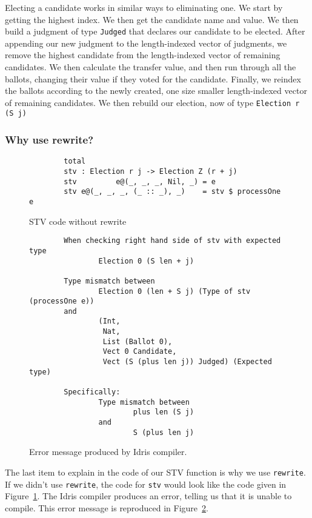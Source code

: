 Electing a candidate works in similar ways to eliminating one. We start by
getting the highest index. We then get the candidate name and value. We then
build a judgment of type \texttt{Judged} that declares our candidate to be
elected. After appending our new judgment to the length-indexed vector of
judgments, we remove the highest candidate from the length-indexed vector of
remaining candidates. We then calculate the transfer value, and then run through
all the ballots, changing their value if they voted for the candidate. Finally,
we reindex the ballots according to the newly created, one size smaller
length-indexed vector of remaining candidates. We then rebuild our election, now
of type \texttt{Election r (S j)}

\subsubsection{Why use rewrite?}


\begin{figure}[ht!!!!!!!!]
	\caption{STV code without rewrite}
	\label{no_rewrite_code}
    \begin{lstlisting}
        total
        stv : Election r j -> Election Z (r + j)
        stv         e@(_, _, _, Nil, _) = e
        stv e@(_, _, _, (_ :: _), _)    = stv $ processOne e
    \end{lstlisting}
\end{figure}

\begin{figure}[ht!!!!!!!!]
	\caption{Error message produced by Idris compiler.}
	\label{idris_error_code}
    \begin{lstlisting}
        When checking right hand side of stv with expected type
                Election 0 (S len + j)

        Type mismatch between
                Election 0 (len + S j) (Type of stv (processOne e))
        and
                (Int,
                 Nat,
                 List (Ballot 0),
                 Vect 0 Candidate,
                 Vect (S (plus len j)) Judged) (Expected type)

        Specifically:
                Type mismatch between
                        plus len (S j)
                and
                        S (plus len j)
    \end{lstlisting}
\end{figure}

The last item to explain in the code of our STV function is why we use
\texttt{rewrite}. If we didn't use \texttt{rewrite}, the code for \texttt{stv}
would look like the code given in Figure~\ref{no_rewrite_code}. The Idris
compiler produces an error, telling us that it is unable to compile. This error
message is reproduced in Figure~\ref{idris_error_code}.

